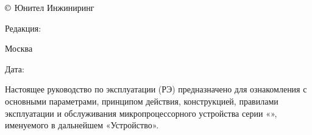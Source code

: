 \pagestyle{fancy}
\fancyhf{}
\renewcommand{\headrulewidth}{1pt}
\lhead{\color{black}{ЮТКБ.656122.611-03.01 РЭ}}
\chead{\color{black}{Редакция \rev~от~\revdate}}
\rhead{\color{unidarkgreen}\colondevicetype}
\lfoot{\color{unidarkgreen}{Руководство по эксплуатации }}
\rfoot{{\thepage}}
\renewcommand{\footrulewidth}{1pt}

\pagecolor{white}

\noindent
$\copyright$ \the\year{} Юнител Инжиниринг
\hfill
\parbox{0.3\textwidth}{\raggedleft Редакция: \textcolor{unigray}{\rev}}

\vskip 3mm
\noindent
Москва
\hfill
\parbox{0.3\textwidth}{\raggedleft Дата: \textcolor{unigray}{\revdate}}
\vskip 5mm

\par
Настоящее руководство по эксплуатации (РЭ) предназначено для ознакомления с основными параметрами, принципом действия, конструкцией, правилами эксплуатации и обслуживания микропроцессорного устройства серии «\colondevicetype», именуемого в дальнейшем «Устройство».

